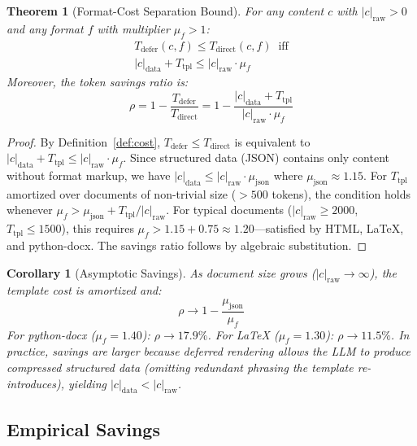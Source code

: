 \documentclass[11pt,twocolumn]{article}
\newtheorem{theorem}{Theorem}
\newtheorem{corollary}{Corollary}
\newcommand{\Tdir}{T_{\mathrm{direct}}}
\newcommand{\Tdef}{T_{\mathrm{defer}}}
\begin{document}
\begin{theorem}[Format-Cost Separation Bound]
\label{thm:fcs}
For any content $c$ with $|c|_{\text{raw}} > 0$ and any format $f$
with multiplier $\mu_f > 1$:
\begin{multline}
\Tdef(c, f) \leq \Tdir(c, f) \;\;\text{iff}\\
|c|_{\text{data}} + T_{\text{tpl}} \leq |c|_{\text{raw}} \cdot \mu_f
\end{multline}
Moreover, the \emph{token savings ratio} is:
\begin{equation}
\rho = 1 - \frac{\Tdef}{\Tdir} = 1 - \frac{|c|_{\text{data}} + T_{\text{tpl}}}{|c|_{\text{raw}} \cdot \mu_f}
\label{eq:savings}
\end{equation}
\end{theorem}

\begin{proof}
By Definition~\ref{def:cost}, $\Tdef \leq \Tdir$ is equivalent to
$|c|_{\text{data}} + T_{\text{tpl}} \leq |c|_{\text{raw}} \cdot \mu_f$.
Since structured data (JSON) contains only content without format
markup, we have $|c|_{\text{data}} \leq |c|_{\text{raw}} \cdot \mu_{\text{json}}$
where $\mu_{\text{json}} \approx 1.15$.  For $T_{\text{tpl}}$
amortized over documents of non-trivial size (${>}500$ tokens),
the condition holds whenever $\mu_f > \mu_{\text{json}} + T_{\text{tpl}}/|c|_{\text{raw}}$.
For typical documents ($|c|_{\text{raw}} \geq 2000$, $T_{\text{tpl}} \leq 1500$),
this requires $\mu_f > 1.15 + 0.75 \approx 1.20$---satisfied by
HTML, \LaTeX{}, and python-docx.
The savings ratio follows by algebraic substitution.
\end{proof}

\begin{corollary}[Asymptotic Savings]
\label{cor:asymptotic}
As document size grows ($|c|_{\text{raw}} \to \infty$), the template
cost is amortized and:
\begin{equation}
\rho \to 1 - \frac{\mu_{\text{json}}}{\mu_f}
\end{equation}
For python-docx ($\mu_f = 1.40$): $\rho \to 17.9\%$.
For \LaTeX{} ($\mu_f = 1.30$): $\rho \to 11.5\%$.
In practice, savings are larger because deferred rendering allows
the LLM to produce \emph{compressed} structured data (omitting
redundant phrasing the template re-introduces), yielding
$|c|_{\text{data}} < |c|_{\text{raw}}$.
\end{corollary}

\subsection{Empirical Savings}
\end{document}
